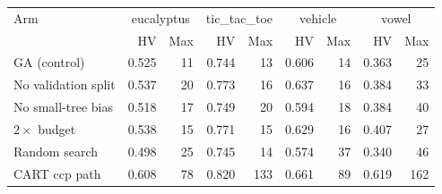 \begin{tabular}{lrrrrrrrr}
\toprule
Arm & \multicolumn{2}{c}{eucalyptus} & \multicolumn{2}{c}{tic\_tac\_toe} & \multicolumn{2}{c}{vehicle} & \multicolumn{2}{c}{vowel} \\
 & HV & Max & HV & Max & HV & Max & HV & Max \\
\midrule
GA (control) & 0.525 & 11 & 0.744 & 13 & 0.606 & 14 & 0.363 & 25 \\
No validation split & 0.537 & 20 & 0.773 & 16 & 0.637 & 16 & 0.384 & 33 \\
No small-tree bias & 0.518 & 17 & 0.749 & 20 & 0.594 & 18 & 0.384 & 40 \\
$2\times$ budget & 0.538 & 15 & 0.771 & 15 & 0.629 & 16 & 0.407 & 27 \\
Random search & 0.498 & 25 & 0.745 & 14 & 0.574 & 37 & 0.340 & 46 \\
CART ccp path & 0.608 & 78 & 0.820 & 133 & 0.661 & 89 & 0.619 & 162 \\
\bottomrule
\end{tabular}
